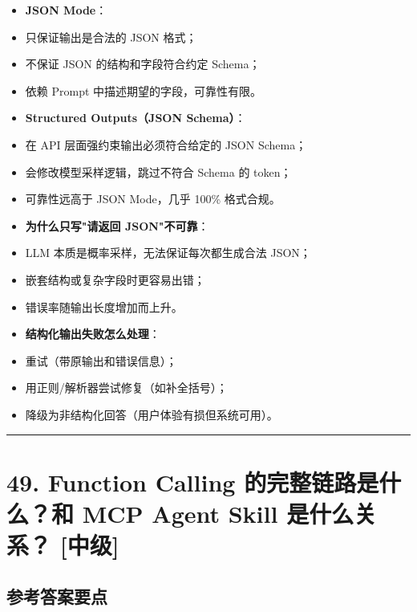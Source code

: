\documentclass[9pt,a4paper,twocolumn]{ctexart}
\newcommand{\lvzhong}{\usebox{\badgezhongbox}}
\def\lvzhong{[中级]}%
\begin{document}
\begin{itemize}[itemsep=1pt, topsep=2pt]
  \item \textbf{JSON Mode}：
  \item 只保证输出是合法的 JSON 格式；
  \item 不保证 JSON 的结构和字段符合约定 Schema；
  \item 依赖 Prompt 中描述期望的字段，可靠性有限。
  \item \textbf{Structured Outputs（JSON Schema）}：
  \item 在 API 层面强约束输出必须符合给定的 JSON Schema；
  \item 会修改模型采样逻辑，跳过不符合 Schema 的 token；
  \item 可靠性远高于 JSON Mode，几乎 100\% 格式合规。
  \item \textbf{为什么只写"请返回 JSON"不可靠}：
  \item LLM 本质是概率采样，无法保证每次都生成合法 JSON；
  \item 嵌套结构或复杂字段时更容易出错；
  \item 错误率随输出长度增加而上升。
  \item \textbf{结构化输出失败怎么处理}：
  \item 重试（带原输出和错误信息）；
  \item 用正则/解析器尝试修复（如补全括号）；
  \item 降级为非结构化回答（用户体验有损但系统可用）。
\end{itemize}


\vspace{2pt}
\noindent\rule{\columnwidth}{0.3pt}\vspace{2pt}



\section*{49. Function Calling 的完整链路是什么？和 MCP Agent Skill 是什么关系？ \lvzhong{}}


\subsection*{参考答案要点}
\end{document}
